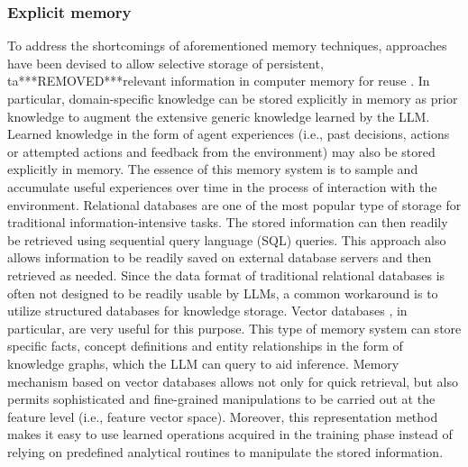 \documentclass[10pt,journal,compsoc]{IEEEtran}
\begin{document}
	\subsubsection{Explicit memory}	 
	To address the shortcomings of aforementioned memory techniques, approaches have been devised to allow selective storage of persistent, ta***REMOVED***relevant information in computer memory for reuse \cite{hatalis2023memory,maharana2024evaluating,hou2024my,wang2024karma}.  In particular, domain-specific knowledge can be stored explicitly in memory as prior knowledge to augment the extensive generic knowledge learned by the LLM. Learned knowledge in the form of agent experiences (i.e., past decisions, actions or attempted actions and feedback from the environment) may also be stored explicitly in memory\cite{yin2024explicit,wu2024longmemeval,zhang2024survey,packer2023memgpt}.  The essence of this memory system is to sample and accumulate useful experiences over time in the process of interaction with the environment.
	Relational databases \cite{hu2023chatdb,liu2023think,hatalis2023memory,qin2024relational} are one of the most popular type of storage for traditional information-intensive tasks. The stored information can then readily be retrieved using sequential query language (SQL) queries. This approach also allows information to be readily saved on external database servers and then retrieved as needed. Since the data format of traditional relational databases is often not designed to be readily usable by LLMs, a common workaround is to utilize structured databases \cite{jiang2023structgpt,patel2024lotus} for knowledge storage. Vector databases \cite{wen2023dilu,zhang2023long,jing2024large,han2023comprehensive}, in particular, are very useful for this purpose. This type of memory system can store specific facts, concept definitions and entity relationships in the form of knowledge graphs, which the LLM can query to aid inference. Memory mechanism based on vector databases allows not only for quick retrieval, but also permits sophisticated and fine-grained manipulations to be carried out at the feature level (i.e., feature vector space). Moreover, this representation method makes it easy to use learned operations acquired in the training phase instead of relying on predefined analytical routines to manipulate the stored information. 
	
\end{document}
